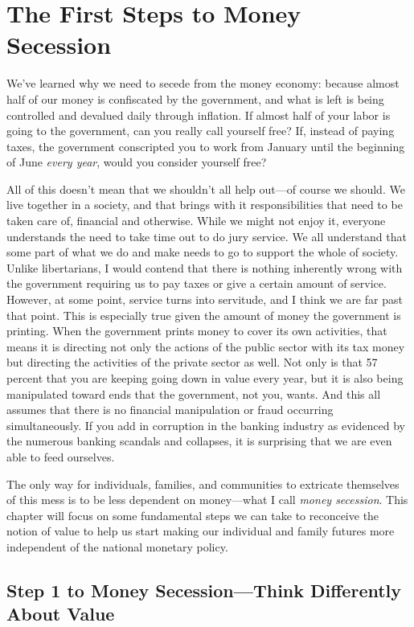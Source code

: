 \chapter{The First Steps to Money Secession}

We’ve learned why we need to secede from the money economy:
because almost half
of our money is confiscated by the government, and what is left is
being controlled and devalued daily through inflation. If almost half of your labor is
going to the government, can you really call yourself free?  If,
instead of paying taxes, the government conscripted you to work from
January until the beginning of June \textit{every year}, would you
consider yourself free?

All of this doesn’t
mean that we shouldn’t all help out---of course we should. We live together
in a society, and that brings with it responsibilities that need to be
taken care of, financial and otherwise.  While we might
not enjoy it, everyone understands the need to take time out to do jury
service. We all understand that some part of what we do and make needs to go to
support the whole of society. Unlike libertarians, I would contend that
there is nothing inherently wrong with the government requiring us to
pay taxes or give a certain amount of service. However, at some point,
service turns into servitude, and I think we are far past that point.
This is especially true given the amount of money the government is
printing. When the government prints money to cover its own activities,
that means it is directing not only the actions of the public sector
with its tax money but directing the activities of the private sector
as well. Not only is that 57 percent that you are keeping going down in
value every year, but it is also being manipulated toward ends that the
government, not you, wants.  And this all assumes that there is no
financial manipulation or fraud occurring simultaneously.  If you add
in corruption in the banking industry as evidenced by the numerous
banking scandals and collapses, it is surprising that we are
even able to feed ourselves.

The only way for individuals, families, and communities to extricate
themselves of this mess is to be less dependent on money---what I call
\textit{money secession}. This chapter
will focus on some fundamental steps we can take to reconceive the
notion of value to help us start making our individual and family futures more independent of
the national monetary policy.

\section{Step 1 to Money Secession---Think Differently About Value}

